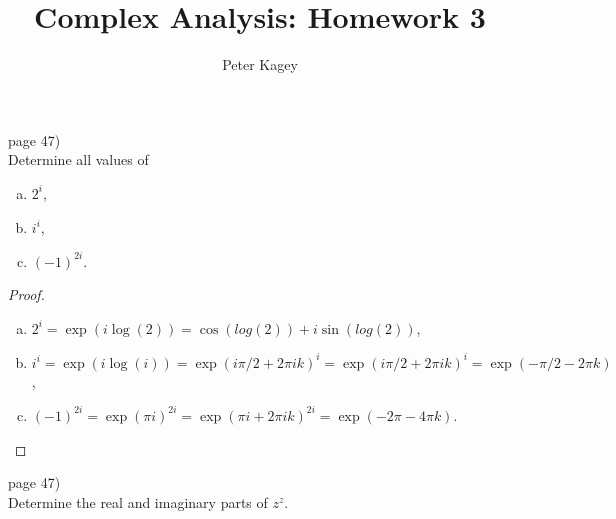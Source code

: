 \documentclass{article}
\newenvironment{problem}[2][Problem]{\begin{trivlist}
\item[\hskip \labelsep {\bfseries #1}\hskip \labelsep {\bfseries #2.}]}{\end{trivlist}}
\begin{document}
\title{Complex Analysis: Homework 3}
\author{Peter Kagey}

\maketitle

\begin{problem}{6} (page 47) \\
  Determine all values of \begin{enumerate}[(a)]
    \item $2^i$,
    \item $i^i$,
    \item $(-1)^{2i}$.
  \end{enumerate}
\end{problem}

\begin{proof} \text{} \\
  \begin{enumerate}[(a)]
    \item $2^i = \exp(i\log(2)) = \cos(log(2)) + i\sin(log(2))$,
    \item $i^i = \exp(i\log(i))
      = \exp(i\pi/2 + 2\pi i k)^i
      = \exp(i\pi/2 + 2\pi i k)^i
      = \exp(-\pi/2 - 2\pi k)
    $,
    \item $(-1)^{2i} = \exp(\pi i)^{2i}
      = \exp(\pi i + 2\pi i k)^{2i}
      = \exp(-2\pi - 4\pi k)
    $.
  \end{enumerate}
\end{proof}
\pagebreak

\begin{problem}{7} (page 47) \\
  Determine the real and imaginary parts of $z^z$.
\end{problem}
\end{document}
